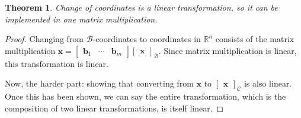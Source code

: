 \documentclass[draft,12pt]{report}
\newtheorem{theorem}{Theorem}
\renewcommand{\vec}[1]{\mathbf{#1}}
\begin{document}
\begin{theorem}
    Change of coordinates is a linear transformation, so it can be implemented in one matrix multiplication.
\end{theorem}
\begin{proof}
    Changing from $\mathcal{B}$-coordinates to coordinates in $\mathbb R^n$ consists of the matrix multiplication $\vec{x} = \begin{bmatrix} \vec{b}_1 & \cdots & \vec{b}_m \end{bmatrix} \begin{bmatrix} \vec{x} \end{bmatrix}_\mathcal{B}$. Since matrix multiplication is linear, this transformation is linear.
    
    Now, the harder part: showing that converting from $\vec{x}$ to $\begin{bmatrix} \vec{x} \end{bmatrix}_\mathcal{C}$ is also linear. Once this has been shown, we can say the entire transformation, which is the composition of two linear transformations, is itself linear.
    

\end{proof}
\end{document}
